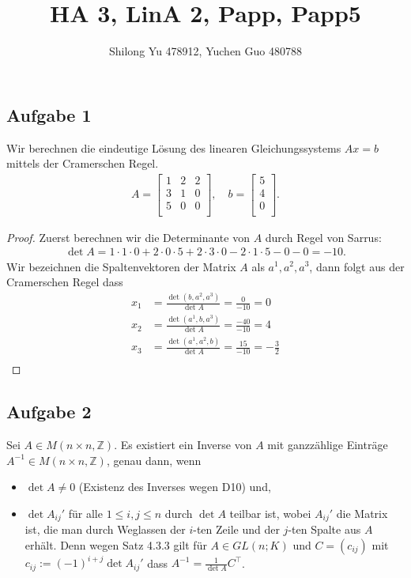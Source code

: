 \documentclass[fleqn,draft,a5paper]{article}
\title{HA 3, LinA 2, Papp, Papp5}
\author{Shilong Yu 478912, Yuchen Guo 480788}
\theoremstyle{remark}
\begin{document}
\maketitle


\subsection{Aufgabe 1}

Wir berechnen die eindeutige Lösung des linearen Gleichungssystems $A
x = b$ mittels der Cramerschen Regel.
\begin{align*}
  A =
\begin{bmatrix}
   1 & 2 & 2 \\   3 & 1 & 0 \\  5 & 0 & 0 \\
 \end{bmatrix}, \quad
 b =
\begin{bmatrix}
  5 \\ 4 \\ 0 \\
\end{bmatrix}.
\end{align*}
\begin{proof}
  Zuerst berechnen wir die Determinante von $A$ durch Regel von
  Sarrus:
  \begin{align*}
    \det A = 1 \cdot 1 \cdot 0 + 2 \cdot 0 \cdot 5 + 2 \cdot 3 \cdot 0 - 2 \cdot 1 \cdot 5 - 0 - 0 = -10.
  \end{align*}
  Wir bezeichnen die Spaltenvektoren der Matrix $A$ als $a^{1}, a^{2},
  a^{3}$, dann folgt aus der Cramerschen Regel dass
  \begin{align*}
       x_{1}  & = \frac{\det(b,a^{2},a^{3})}{\det A} = \frac{0}{-10}
      = 0 \\
       x_{2} & = \frac{\det(a^{1},b,a^{3})}{\det A} = \frac{-40}{-10}
      = 4 \\
       x_{3} & = \frac{\det{(a^{1},a^{2},b)}}{\det A}= \frac{15}{-10}
      = -\frac{3}{2} \\
  \end{align*}
\end{proof}

\subsection{Aufgabe 2}
  Sei $A \in M(n \times n, \mathbb{Z})$.  Es existiert ein Inverse von $A$ mit ganzzählige
  Einträge $A^{-1} \in M(n\times n, \mathbb{Z})$, genau dann, wenn
  \begin{itemize}
   \item   $\det A \ne 0$
  (Existenz des Inverses wegen D10) und,
  \item      $\det A_{ij}'$ für alle $1 \le i,
  j \le n$ durch $\det A$ teilbar ist, wobei $A_{ij}'$ die Matrix ist,
  die man durch Weglassen der $i$-ten Zeile und der $j$-ten Spalte aus
  $A$ erhält.
  Denn wegen Satz 4.3.3 gilt für $A \in GL(n; K)$ und $C =
  (c_{ij})$ mit $c_{ij} := (-1)^{i+j} \det A_{ij}'$ dass
$ A^{-1} = \frac{1}{\det A} C^{\top}$.
\end{itemize}
\end{document}

